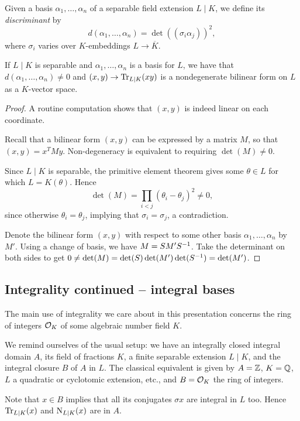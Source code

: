 Given a basis $\alpha_1,\dots,\alpha_n$ of a separable field extension $L\mid K$, we define its \emph{discriminant} by
\[
	d(\alpha_1,\dots,\alpha_n) = \det((\sigma_i\alpha_j))^2,
\]
where $\sigma_i$ varies over $K$-embeddings $L\to\overline{K}$.


\begin{prop}
	If $L\mid K$ is separable and $\alpha_1,\dots,\alpha_n$ is a basis for $L$, we have that $d(\alpha_1,\dots,\alpha_n)\neq 0$ and $(x,y) \to \operatorname{Tr}_{L\mid K}(xy)$ is a nondegenerate bilinear form on $L$ as a $K$-vector space.
\end{prop}
\begin{proof}
	A routine computation shows that $(x,y)$ is indeed linear on each coordinate.

	Recall that a bilinear form $(x,y)$ can be expressed by a matrix $M$, so that $(x,y) = x^T M y$. Non-degeneracy is equivalent to requiring $\det(M)\neq 0$.
	
	Since $L\mid K$ is separable, the primitive element theorem gives some $\theta\in L$ for which $L=K(\theta)$. Hence
	\[
		\det(M) = \prod_{i<j}(\theta_i-\theta_j)^2 \neq 0,
	\]
	since otherwise $\theta_i = \theta_j$, implying that $\sigma_i=\sigma_j$, a contradiction.

	Denote the bilinear form $(x,y)$ with respect to some other basis $\alpha_1,\dots,\alpha_n$ by $M'$. Using a change of basis, we have $M=SM'S^{-1}$. Take the determinant on both sides to get $0\neq\det(M)=\det(S)\det(M')\det(S^{-1})=\det(M')$.
\end{proof}



\subsection{Integrality continued -- integral bases}


The main use of integrality we care about in this presentation concerns the ring of integers $\mathcal{O}_K$ of some algebraic number field $K$. 

We remind ourselves of the usual setup: we have an integrally closed integral domain $A$, its field of fractions $K$, a finite separable extension $L\mid K$, and the integral closure $B$ of $A$ in $L$. The classical equivalent is given by $A=\mathbb{Z}$, $K=\mathbb{Q}$, $L$ a quadratic or cyclotomic extension, etc., and $B=\mathcal{O}_K$ the ring of integers.

Note that $x\in B$ implies that all its conjugates $\sigma x$ are integral in $L$ too. Hence $\operatorname{Tr}_{L\mid K}(x)$ and $\operatorname{N}_{L\mid K}(x)$ are in $A$.

